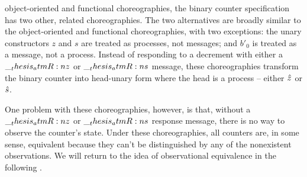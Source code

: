 

 object-oriented and functional choreographies, the binary counter specification has two other, related choreographies.
The two alternatives are broadly similar to the object-oriented and functional choreographies, with two exceptions: the unary constructors $z$ and $s$ are treated as processes, not messages; and $b'_0$ is treated as a message, not a process.
Instead of responding to a decrement with either a $\__thesis_atmR:n {z}$ or $\__thesis_atmR:n {s}$ message, these choreographies transform the binary counter into head-unary form where the head is a process -- either $\hat{z}$ or $\hat{s}$.

One problem with these choreographies, however, is that, without a $\__thesis_atmR:n {z}$ or $\__thesis_atmR:n {s}$ response message, there is no way to observe the counter's state.
Under these choreographies, all counters are, in some sense, equivalent because they can't be distinguished by any of the nonexistent observations.
We will return to the idea of observational equivalence in the following .

